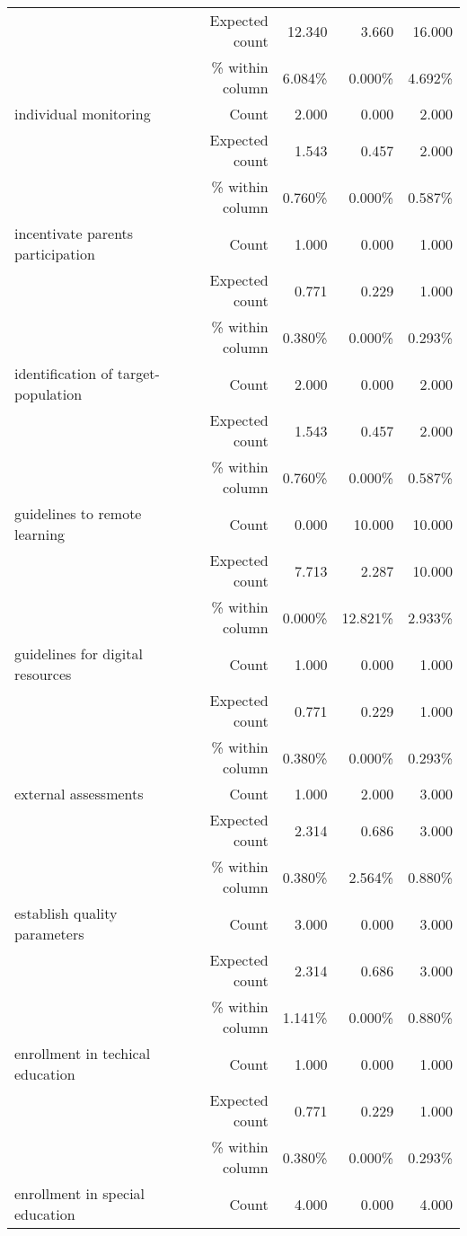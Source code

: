 \documentclass[6pt, oneside]{article}   	%
\begin{document}
\begin{table}[h]
{\begin{tabular}{lrrrr}
			 & Expected count & 12.340 & 3.660 & 16.000  \\
			 &  \% within column & 6.084\% & 0.000\% & 4.692\%  \\
			individual monitoring & Count & 2.000 & 0.000 & 2.000  \\
			 & Expected count & 1.543 & 0.457 & 2.000  \\
			 &  \% within column & 0.760\% & 0.000\% & 0.587\%  \\
			incentivate parents participation & Count & 1.000 & 0.000 & 1.000  \\
			 & Expected count & 0.771 & 0.229 & 1.000  \\
			 &  \% within column & 0.380\% & 0.000\% & 0.293\%  \\
			identification of target-population & Count & 2.000 & 0.000 & 2.000  \\
			 & Expected count & 1.543 & 0.457 & 2.000  \\
			 &  \% within column & 0.760\% & 0.000\% & 0.587\%  \\
			guidelines to remote learning & Count & 0.000 & 10.000 & 10.000  \\
			 & Expected count & 7.713 & 2.287 & 10.000  \\
			 &  \% within column & 0.000\% & 12.821\% & 2.933\%  \\
			guidelines for digital resources & Count & 1.000 & 0.000 & 1.000  \\
			 & Expected count & 0.771 & 0.229 & 1.000  \\
			 &  \% within column & 0.380\% & 0.000\% & 0.293\%  \\
			external assessments & Count & 1.000 & 2.000 & 3.000  \\
			 & Expected count & 2.314 & 0.686 & 3.000  \\
			 &  \% within column & 0.380\% & 2.564\% & 0.880\%  \\
			establish quality parameters & Count & 3.000 & 0.000 & 3.000  \\
			 & Expected count & 2.314 & 0.686 & 3.000  \\
			 &  \% within column & 1.141\% & 0.000\% & 0.880\%  \\
			enrollment in techical education & Count & 1.000 & 0.000 & 1.000  \\
			 & Expected count & 0.771 & 0.229 & 1.000  \\
			 &  \% within column & 0.380\% & 0.000\% & 0.293\%  \\
			enrollment in special education & Count & 4.000 & 0.000 & 4.000  \\

\end{tabular}}
\end{table}
\end{document}
